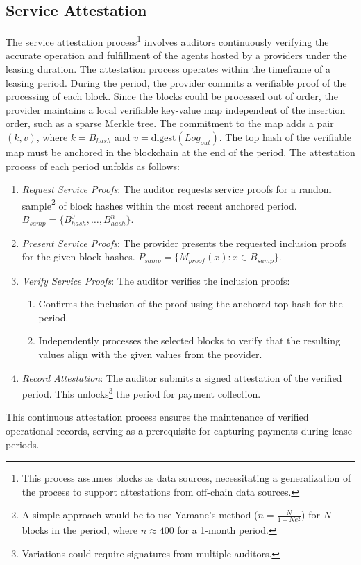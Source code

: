\documentclass{oc}
\begin{document}
\subsection{Service Attestation}\label{sec:service-attestation}

The service attestation process\footnote{
  This process assumes blocks as data sources, necessitating a generalization of the process to support attestations from off-chain data sources.
} involves \glspl{auditor} continuously verifying the accurate operation and fulfillment of the agents hosted by a \glspl{provider} under the leasing duration.
The attestation process operates within the timeframe of a leasing period.
During the period, the provider commits a verifiable proof of the processing of each block.
Since the blocks could be processed out of order, the \gls{provider} maintains a local verifiable key-value map independent of the insertion order, such as a sparse Merkle tree\cite{cryptoeprint:2016/683}.
The commitment to the map adds a pair $(k, v)$, where $k=B_{hash}$ and $v=\text{digest}(Log_{out})$.
The top hash of the verifiable map must be anchored in the blockchain at the end of the period.
The attestation process of each period unfolds as follows:

\begin{enumerate}
  \item \emph{Request Service Proofs}: The \gls{auditor} requests service proofs for a random sample\footnote{
    A simple approach would be to use Yamane's method ($n=\frac{N}{1+Ne^2}$) for $N$ blocks in the period, where $n\approx400$ for a 1-month period.
  } of block hashes within the most recent anchored period. $B_{samp}=\{B_{hash}^0,\ldots,B_{hash}^n\}$.
  
  \item \emph{Present Service Proofs}: The \gls{provider} presents the requested inclusion proofs for the given block hashes. $P_{samp}=\{M_{proof}(x) : x \in B_{samp}\}$.
  
  \item \emph{Verify Service Proofs}: The \gls{auditor} verifies the inclusion proofs:
    \begin{enumerate}
      \item Confirms the inclusion of the proof using the anchored top hash for the period.
      \item Independently processes the selected blocks to verify that the resulting values align with the given values from the provider.
    \end{enumerate}
  
  \item \emph{Record Attestation}: The \gls{auditor} submits a signed attestation of the verified period. This unlocks\footnote{
    Variations could require signatures from multiple auditors.
  } the period for payment collection.
\end{enumerate}

This continuous attestation process ensures the maintenance of verified operational records, serving as a prerequisite for capturing payments during lease periods.


\clearpage

\printglossary


\end{document}
